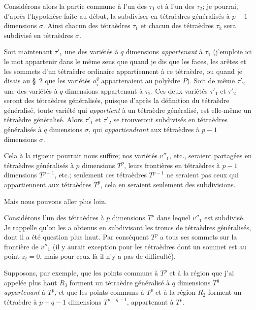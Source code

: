 \documentclass{article}
\begin{document}
Considérons alors la partie commune à l'un des $\tau_{1}$ et à l'un des $\tau_{2}$; je pourrai, d'après l'hypothèse faite au début, la subdiviser en tétraèdres généralisés à $p - 1$ dimensions $\sigma$. Ainsi chacun des tétraèdres $\tau_{1}$ et chacun des tétraèdres $\tau_{2}$ sera subdivisé en tétraèdres $\sigma$.

Soit maintenant $\tau'_{1}$ une des variétés à $q$ dimensions \emph{appartenant} à $\tau_{1}$ (j'emploie ici le mot appartenir dans le même sens que quand je dis que les faces, les arêtes et les sommets d'un tétraèdre ordinaire appartiennent à ce tétraèdre, ou quand je disais au \S~2 que les variétés $a^{q}_{i}$ appartenaient au polyèdre $P$). Soit de même $\tau'_{2}$ une des variétés à $q$ dimensions appartenant à $\tau_{2}$. Ces deux variétés $\tau'_{1}$ et $\tau'_{2}$ seront des tétraèdres généralisés, puisque d'après la définition du tétraèdre généralisé, toute variété qui \emph{appartient} à un tétraèdre généralisé, est elle-même un tétraèdre généralisé. Alors $\tau'_{1}$ et $\tau'_{2}$ se trouveront subdivisés en tétraèdres
généralisés à $q$ dimensions $\sigma$, qui \emph{appartiendront} aux tétraèdres à $p - 1$ dimensions $\sigma$.

Cela à la rigueur pourrait nous suffire; nos variétés $v''_{1}$, etc., seraient partagées en tétraèdres généralisés à $p$ dimensions $T^{p}$, leurs frontières en tétraèdres à $p - 1$ dimensions $T^{p-1}$, etc.; seulement ces tétraèdres $T^{p-1}$ ne seraient pas ceux qui appartiennent aux tétraèdres $T^{p}$, cela en seraient seulement des subdivisions.

Mais nous pouvons aller plus loin.

Considérons l'un des tétraèdres à $p$ dimensions $T^{p}$ dans lequel $v''_{1}$ est subdivisé. Je rappelle qu'on les a obtenus en subdivisant les troncs de tétraèdres généralisés, dont il a été question plus haut. Par conséquent $T^{p}$ a tous ses sommets sur la frontière de $v''_{1}$ (il y aurait exception pour les tétraèdres dont un sommet est au point $z_{i} = 0$, mais pour ceux-là il n'y a pas de difficulté).

Supposons, par exemple, que les points communs à $T^{p}$ et à la région que j'ai appelée plus haut $R_{3}$ forment un tétraèdre généralisé à $q$ dimensions $T^{q}$ \emph{appartenant} à $T^{p}$, et que les points communs à $T^{p}$ et à la région $R_{2}$ forment un tétraèdre à $p - q - 1$ dimensions $T^{p-q-1}$, appartenant à $T^{p}$.
\end{document}
